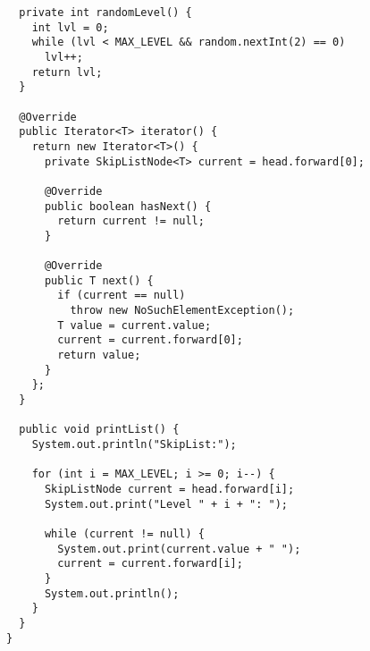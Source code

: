 \begin{verbatim}
  private int randomLevel() {
    int lvl = 0;
    while (lvl < MAX_LEVEL && random.nextInt(2) == 0)
      lvl++;
    return lvl;
  }

  @Override
  public Iterator<T> iterator() {
    return new Iterator<T>() {
      private SkipListNode<T> current = head.forward[0];

      @Override
      public boolean hasNext() {
        return current != null;
      }

      @Override
      public T next() {
        if (current == null)
          throw new NoSuchElementException();
        T value = current.value;
        current = current.forward[0];
        return value;
      }
    };
  }

  public void printList() {
    System.out.println("SkipList:");

    for (int i = MAX_LEVEL; i >= 0; i--) {
      SkipListNode current = head.forward[i];
      System.out.print("Level " + i + ": ");

      while (current != null) {
        System.out.print(current.value + " ");
        current = current.forward[i];
      }
      System.out.println();
    }
  }
}
\end{verbatim}